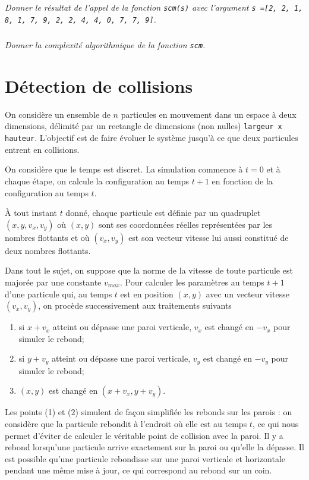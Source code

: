 \documentclass[10pt,fleqn]{article} %
\begin{document}
\subparagraph{}
\textit{Donner le résultat de l'appel de la fonction \texttt{scm(s)} avec l'argument \texttt{s =[2, 2, 1, 8, 1, 7, 9, 2, 2, 4, 4, 0, 7, 7, 9]}.}

\subparagraph{}
\textit{Donner la complexité algorithmique de la fonction \texttt{scm}.}


\section*{Détection de collisions}

On considère un ensemble de $n$ particules en mouvement dans un espace à deux dimensions, délimité par un rectangle de dimensions (non nulles) \texttt{largeur x hauteur}. L'objectif est de faire évoluer le système jusqu'à ce que deux particules entrent en collisions.

On considère que le temps est discret. La simulation commence à $t=0$ et à chaque étape, on calcule la configuration au temps $t+1$ en fonction de la configuration au temps $t$. 

À tout instant $t$ donné, chaque particule est définie par un quadruplet $(x,y,v_x,v_y)$ où $(x,y)$ sont ses coordonnées réelles représentées par les nombres flottants et où $(v_x,v_y)$ est son vecteur vitesse lui aussi constitué de deux nombres flottants. 

Dans tout le sujet, on suppose que la norme de la vitesse de toute particule est majorée par une constante $v_{max}$. Pour calculer les paramètres au temps $t+1$ d'une particule qui, au temps $t$ est en position $(x,y)$ avec un vecteur vitesse $(v_x,v_y)$, on procède successivement aux traitements suivants %
\begin{enumerate}
\item si $x+v_x$ atteint ou dépasse une paroi verticale, $v_x$ est changé en $-v_x$ pour simuler le rebond;
\item si $y+v_y$ atteint ou dépasse une paroi verticale, $v_y$ est changé en $-v_y$ pour simuler le rebond;
\item $(x,y)$ est changé en $(x+v_x,y+v_y)$. 
\end{enumerate}
Les points (1) et (2) simulent de façon simplifiée les rebonds sur les parois : on considère que la particule rebondit à l'endroit où elle est au temps $t$, ce qui nous permet d'éviter de calculer le véritable point de collision avec la paroi. Il y a rebond lorsqu'une particule arrive exactement sur la paroi ou qu'elle la dépasse. Il est possible qu'une particule rebondisse sur une paroi verticale et horizontale pendant une même mise à jour, ce qui correspond au rebond sur un coin.
\end{document}
